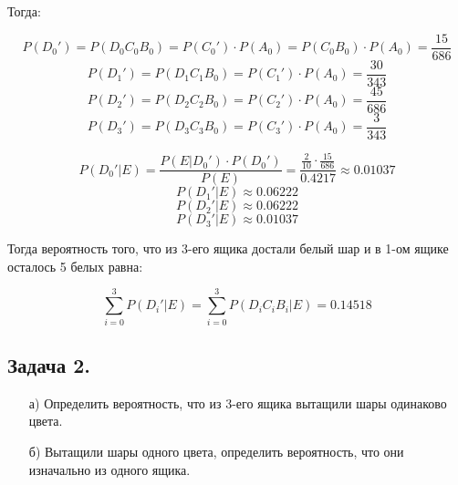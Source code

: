 Тогда:

\[ P(D_0') = P(D_0C_0B_0) = P(C_0') \cdot P(A_0) = P(C_0B_0) \cdot P(A_0) = \dfrac{15}{686} \]
\[ P(D_1') = P(D_1C_1B_0) = P(C_1') \cdot P(A_0) = \dfrac{30}{343} \]
\[ P(D_2') = P(D_2C_2B_0) = P(C_2') \cdot P(A_0) = \dfrac{45}{686} \]
\[ P(D_3') = P(D_3C_3B_0) = P(C_3') \cdot P(A_0) = \dfrac{3}{343} \]

\[ P(D_0'|E) = \dfrac{P(E|D_0') \cdot P(D_0')}{P(E)} = \dfrac{\frac{2}{10} \cdot \frac{15}{686}}{0.4217} \approx 0.01037 \]
\[ P(D_1'|E) \approx 0.06222 \]
\[ P(D_2'|E) \approx 0.06222 \]
\[ P(D_3'|E) \approx 0.01037 \]

Тогда вероятность того, что из 3-его ящика достали белый шар и в 1-ом ящике осталось 5 белых равна:

\[ \sum_{i=0}^{3} P(D_i'|E) = \sum_{i=0}^{3} P(D_iC_iB_i|E) = 0.14518 \]

\newpage










\subsection*{Задача 2.}

\begin{figure}[H]
\end{figure}

\begin{enumerate}
	\item [а)] Определить вероятность, что из 3-его ящика вытащили шары одинаково цвета.
	\item [б)] Вытащили шары одного цвета, определить вероятность, что они изначально из одного ящика.
\end{enumerate}

